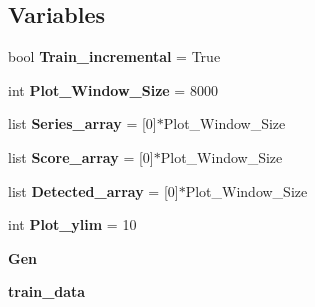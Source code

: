\subsection*{Variables}
\begin{DoxyCompactItemize}
\item 
bool {\bfseries Train\+\_\+incremental} = True\hypertarget{namespaceSAD_1_1Main__Timestamp_a011586e83c3a13cad8dc17bb9d084619}{}\label{namespaceSAD_1_1Main__Timestamp_a011586e83c3a13cad8dc17bb9d084619}

\item 
int {\bfseries Plot\+\_\+\+Window\+\_\+\+Size} = 8000\hypertarget{namespaceSAD_1_1Main__Timestamp_a61708b02a3c167225c59ac0f61724daa}{}\label{namespaceSAD_1_1Main__Timestamp_a61708b02a3c167225c59ac0f61724daa}

\item 
list {\bfseries Series\+\_\+array} = \mbox{[}0\mbox{]}$\ast$Plot\+\_\+\+Window\+\_\+\+Size\hypertarget{namespaceSAD_1_1Main__Timestamp_a618ae9c7f9cff5df67f8072c312b70da}{}\label{namespaceSAD_1_1Main__Timestamp_a618ae9c7f9cff5df67f8072c312b70da}

\item 
list {\bfseries Score\+\_\+array} = \mbox{[}0\mbox{]}$\ast$Plot\+\_\+\+Window\+\_\+\+Size\hypertarget{namespaceSAD_1_1Main__Timestamp_ab8dcf18772ce1ad9aefcbc88900190ef}{}\label{namespaceSAD_1_1Main__Timestamp_ab8dcf18772ce1ad9aefcbc88900190ef}

\item 
list {\bfseries Detected\+\_\+array} = \mbox{[}0\mbox{]}$\ast$Plot\+\_\+\+Window\+\_\+\+Size\hypertarget{namespaceSAD_1_1Main__Timestamp_a26ab78ba983e3b8a9181939d755c8f81}{}\label{namespaceSAD_1_1Main__Timestamp_a26ab78ba983e3b8a9181939d755c8f81}

\item 
int {\bfseries Plot\+\_\+ylim} = 10\hypertarget{namespaceSAD_1_1Main__Timestamp_a8f503ba9b37038ac3115c4c612cf4718}{}\label{namespaceSAD_1_1Main__Timestamp_a8f503ba9b37038ac3115c4c612cf4718}

\item 
{\bfseries Gen}\hypertarget{namespaceSAD_1_1Main__Timestamp_a88eb3a987cf00bd45598ec9c57b2e991}{}\label{namespaceSAD_1_1Main__Timestamp_a88eb3a987cf00bd45598ec9c57b2e991}

\item 
{\bfseries train\+\_\+data}\hypertarget{namespaceSAD_1_1Main__Timestamp_a93b3cae7a7e75c4bc918789525528fa6}{}\label{namespaceSAD_1_1Main__Timestamp_a93b3cae7a7e75c4bc918789525528fa6}


\end{DoxyCompactItemize}
